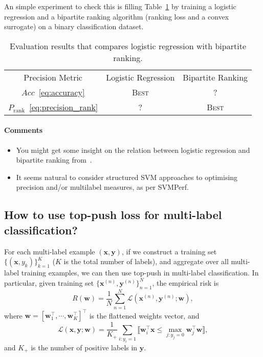 \documentclass[9pt]{extarticle}
\newcommand{\llb}{\llbracket}
\newcommand{\rrb}{\rrbracket}
\newcommand{\x}{\mathbf{x}}
\newcommand{\y}{\mathbf{y}}
\newcommand{\1}{\mathbf{1}}
\newcommand{\w}{\mathbf{w}}
\newcommand{\LCal}{\mathcal{L}}
\newcommand{\pb}[1]{^{({#1})}}
\begin{document}
An simple experiment to check this is filling Table~\ref{tab:precision} by training a logistic regression and a bipartite ranking algorithm (ranking loss and a convex surrogate) on a binary classification dataset.
\begin{table}[!h]
\centering
\begin{tabular}{c|cc} \hline \hline
Precision Metric                        & Logistic Regression & Bipartite Ranking \\
$Acc$~\ref{eq:accuracy}                 & \textsc{Best}       & ?                 \\
$P_\text{rank}$~\ref{eq:precision_rank} & ?                   & \textsc{Best}     \\ \hline
\end{tabular}
\caption{Evaluation results that compares logistic regression with bipartite ranking.}
\label{tab:precision}
\end{table}

\paragraph{Comments}
{\it
\begin{itemize}
\item You might get some insight on the relation between logistic regression and bipartite ranking from~\cite{kotlowski2011bipartite}.
\item It seems natural to consider structured SVM approaches to optimising precision and/or multilabel measures, as per SVMPerf.
\end{itemize}
}


\subsection*{How to use top-push loss for multi-label classification?}

For each multi-label example $(\x, \y)$, if we construct a training set $\{(\x, y_k)\}_{k=1}^K$ ($K$ is the total number of labels),
and aggregate over all multi-label training examples, we can then use top-push in multi-label classification. 
In particular, given training set $\{\x\pb{n}, \y\pb{n}\}_{n=1}^N$, the empirical risk is
\begin{equation*}
R(\w) = \frac{1}{N} \sum_{n=1}^N \LCal(\x\pb{n}, \y\pb{n}; \w),
\end{equation*}
where $\w = [\w_1^\top, \cdots, \w_K^\top]^\top$ is the flattened weights vector, and
\begin{equation}
\LCal(\x, \y; \w) = \frac{1}{K_+} \sum_{i:y_i=1} \llb \w_i^\top \x \le \underset{j:y_j=0}{\max} \w_j^\top \w \rrb,
\end{equation}
and $K_+$ is the number of positive labels in $\y$.
\end{document}
